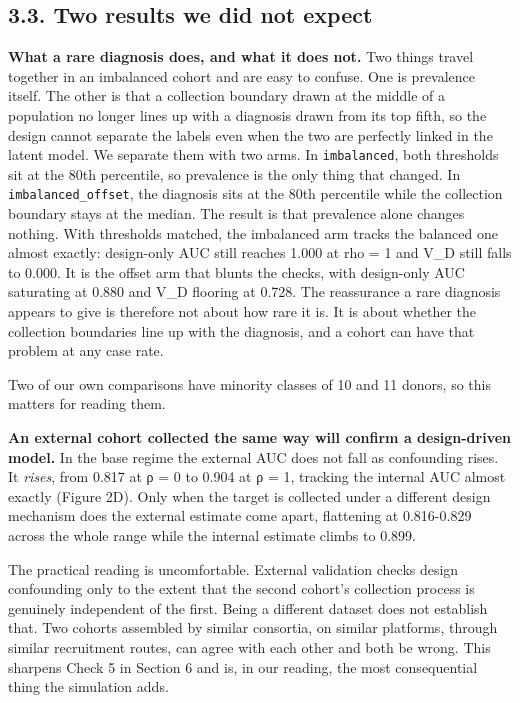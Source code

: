 \subsection{3.3. Two results we did not expect}\label{two-results-we-did-not-expect}

\textbf{What a rare diagnosis does, and what it does not.} Two things travel together in an imbalanced cohort and are easy to confuse. One is prevalence itself. The other is that a collection boundary drawn at the middle of a population no longer lines up with a diagnosis drawn from its top fifth, so the design cannot separate the labels even when the two are perfectly linked in the latent model. We separate them with two arms. In \texttt{imbalanced}, both thresholds sit at the 80th percentile, so prevalence is the only thing that changed. In \texttt{imbalanced\_offset}, the diagnosis sits at the 80th percentile while the collection boundary stays at the median. The result is that prevalence alone changes nothing. With thresholds matched, the imbalanced arm tracks the balanced one almost exactly: design-only AUC still reaches 1.000 at rho = 1 and V\_D still falls to 0.000. It is the offset arm that blunts the checks, with design-only AUC saturating at 0.880 and V\_D flooring at 0.728. The reassurance a rare diagnosis appears to give is therefore not about how rare it is. It is about whether the collection boundaries line up with the diagnosis, and a cohort can have that problem at any case rate.

Two of our own comparisons have minority classes of 10 and 11 donors, so this matters for reading them.

\textbf{An external cohort collected the same way will confirm a design-driven model.} In the base regime the external AUC does not fall as confounding rises. It \emph{rises}, from 0.817 at ρ = 0 to 0.904 at ρ = 1, tracking the internal AUC almost exactly (Figure 2D). Only when the target is collected under a different design mechanism does the external estimate come apart, flattening at 0.816-0.829 across the whole range while the internal estimate climbs to 0.899.

The practical reading is uncomfortable. External validation checks design confounding only to the extent that the second cohort's collection process is genuinely independent of the first. Being a different dataset does not establish that. Two cohorts assembled by similar consortia, on similar platforms, through similar recruitment routes, can agree with each other and both be wrong. This sharpens Check 5 in Section 6 and is, in our reading, the most consequential thing the simulation adds.

